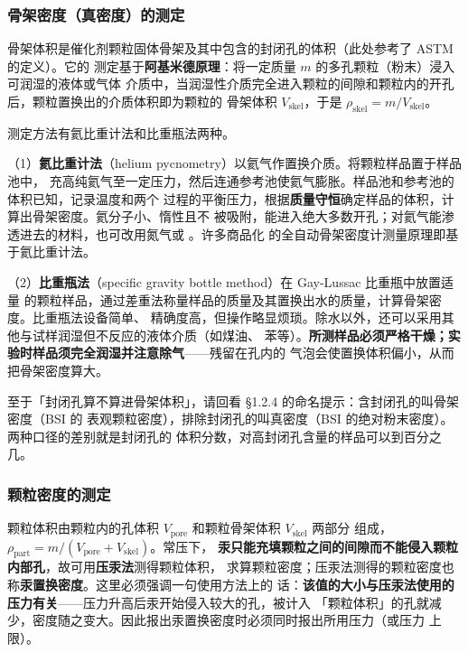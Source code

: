 \subsubsection{骨架密度（真密度）的测定}

骨架体积是催化剂颗粒固体骨架及其中包含的封闭孔的体积（此处参考了 ASTM 的定义）。它的
测定基于\textbf{阿基米德原理}：将一定质量 $m$ 的多孔颗粒（粉末）浸入可润湿的液体或气体
介质中，当润湿性介质完全进入颗粒的间隙和颗粒内的开孔后，颗粒置换出的介质体积即为颗粒的
骨架体积 $V_{\mathrm{skel}}$，于是 $\rho_{\mathrm{skel}}=m/V_{\mathrm{skel}}$。

测定方法有氦比重计法和比重瓶法两种。

（1）\textbf{氦比重计法}（helium pycnometry）以氦气作置换介质。将颗粒样品置于样品池中，
充高纯氦气至一定压力，然后连通参考池使氦气膨胀。样品池和参考池的体积已知，记录温度和两个
过程的平衡压力，根据\textbf{质量守恒}确定样品的体积，计算出骨架密度。氦分子小、惰性且不
被吸附，能进入绝大多数开孔；对氦气能渗透进去的材料，也可改用氮气或 。许多商品化
的全自动骨架密度计测量原理即基于氦比重计法。

（2）\textbf{比重瓶法}（specific gravity bottle method）在 Gay-Lussac 比重瓶中放置适量
的颗粒样品，通过差重法称量样品的质量及其置换出水的质量，计算骨架密度。比重瓶法设备简单、
精确度高，但操作略显烦琐。除水以外，还可以采用其他与试样润湿但不反应的液体介质（如煤油、
苯等）。\textbf{所测样品必须严格干燥；实验时样品须完全润湿并注意除气}——残留在孔内的
气泡会使置换体积偏小，从而把骨架密度算大。

至于「封闭孔算不算进骨架体积」，请回看 §1.2.4 的命名提示：含封闭孔的叫骨架密度（BSI 的
表观颗粒密度），排除封闭孔的叫真密度（BSI 的绝对粉末密度）。两种口径的差别就是封闭孔的
体积分数，对高封闭孔含量的样品可以到百分之几。

\subsubsection{颗粒密度的测定}

颗粒体积由颗粒内的孔体积 $V_{\mathrm{pore}}$ 和颗粒骨架体积 $V_{\mathrm{skel}}$ 两部分
组成，$\rho_{\mathrm{part}}=m/(V_{\mathrm{pore}}+V_{\mathrm{skel}})$。常压下，
\textbf{汞只能充填颗粒之间的间隙而不能侵入颗粒内部孔}，故可用\textbf{压汞法}测得颗粒体积，
求算颗粒密度；压汞法测得的颗粒密度也称\textbf{汞置换密度}。这里必须强调一句使用方法上的
话：\textbf{该值的大小与压汞法使用的压力有关}——压力升高后汞开始侵入较大的孔，被计入
「颗粒体积」的孔就减少，密度随之变大。因此报出汞置换密度时必须同时报出所用压力（或压力
上限）。

